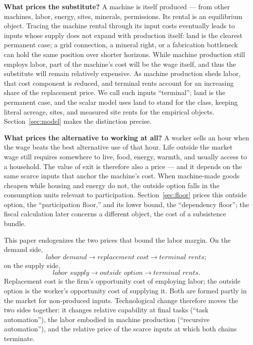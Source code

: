 \documentclass[12pt]{article}
\theoremstyle{plain}
\begin{document}
\textbf{What prices the substitute?} A machine is itself produced --- from other machines, labor, energy, sites, minerals, permissions. Its rental is an equilibrium object. Tracing the machine rental through its input costs eventually leads to inputs whose supply does not expand with production itself: land is the clearest permanent case; a grid connection, a mineral right, or a fabrication bottleneck can hold the same position over shorter horizons. While machine production still employs labor, part of the machine's cost will be the wage itself, and thus the substitute will remain relatively expensive. As machine production sheds labor, that cost component is reduced, and terminal rents account for an increasing share of the replacement price. We call such inputs ``terminal''; land is the permanent case, and the scalar model uses land to stand for the class, keeping literal acreage, sites, and measured site rents for the empirical objects. Section~\ref{sec:model} makes the distinction precise.

\textbf{What prices the alternative to working at all?} A worker sells an hour when the wage beats the best alternative use of that hour. Life outside the market wage still requires somewhere to live, food, energy, warmth, and usually access to a household. The value of exit is therefore also a price --- and it depends on the same scarce inputs that anchor the machine's cost. When machine-made goods cheapen while housing and energy do not, the outside option falls in the consumption units relevant to participation. Section~\ref{sec:floor} prices this outside option, the ``participation floor,'' and its lower bound, the ``dependency floor''; the fiscal calculation later concerns a different object, the cost of a subsistence bundle.

This paper endogenizes the two prices that bound the labor margin. On the demand side,
\[
\textit{labor demand} \to \textit{replacement cost} \to \textit{terminal rents};
\]
on the supply side,
\[
\textit{labor supply} \to \textit{outside option} \to \textit{terminal rents}.
\]
Replacement cost is the firm's opportunity cost of employing labor; the outside option is the worker's opportunity cost of supplying it. Both are formed partly in the market for non-produced inputs. Technological change therefore moves the two sides together: it changes relative capability at final tasks (``task automation''), the labor embodied in machine production (``recursive automation''), and the relative price of the scarce inputs at which both chains terminate.
\end{document}
